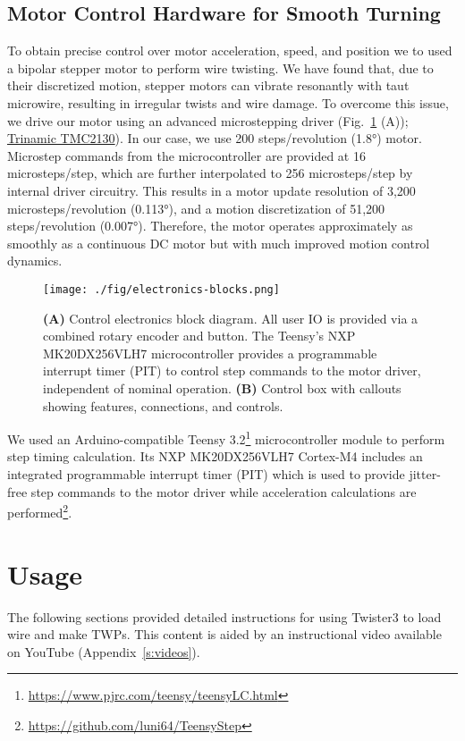 \documentclass[11pt,a4paper]{article}
\begin{document}
\subsection{Motor Control Hardware for Smooth Turning}
To obtain precise control over motor acceleration, speed, and position we
to used a bipolar stepper motor to perform wire twisting. We have found that,
due to their discretized motion, stepper motors can vibrate resonantly with
taut microwire, resulting in irregular twists and wire damage. To overcome
this issue, we drive our motor using an advanced microstepping driver
(Fig.~\ref{f:ctrl-box} (A));
\href{https://www.trinamic.com/products/integrated-circuits/details/tmc2100/}{Trinamic
TMC2130}). In our case, we use 200 steps/revolution (\ang{1.8})
motor. Microstep commands from the microcontroller are provided at 16
microsteps/step, which are further interpolated to 256 microsteps/step by
internal driver circuitry. This results in a motor update resolution of 3,200
microsteps/revolution (\ang{0.113}), and a motion discretization of 51,200
steps/revolution (\ang{0.007}). Therefore, the motor operates approximately as
smoothly as a continuous DC motor but with much improved motion control
dynamics.

\begin{figure}
\centering
\texttt{[image: ./fig/electronics-blocks.png]}
\caption{\textbf{(A)} Control electronics block diagram. All user IO is
    provided via a combined rotary encoder and button. The Teensy's NXP
    MK20DX256VLH7 microcontroller provides a  programmable interrupt timer
    (PIT) to control step commands to the motor driver, independent of nominal
    operation.
    \textbf{(B)} Control box with callouts showing features, connections, and
    controls.}
\label{f:ctrl-box}
\end{figure}

We used an Arduino-compatible Teensy
3.2\footnote{\url{https://www.pjrc.com/teensy/teensyLC.html}} microcontroller
module to perform step timing calculation. Its NXP MK20DX256VLH7 Cortex-M4
includes an integrated programmable interrupt timer (PIT) which is used to
provide jitter-free step commands to the motor driver while acceleration
calculations are
performed\footnote{\url{https://github.com/luni64/TeensyStep}}.

\section{Usage}
The following sections provided detailed instructions for using Twister3 to
load wire and make TWPs. This content is aided by an instructional video
available on YouTube (Appendix~\ref{s:videos}).
\end{document}
